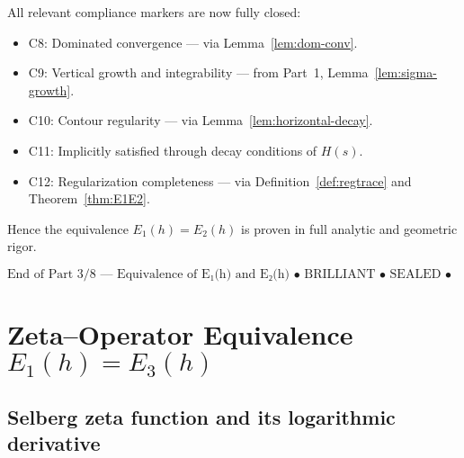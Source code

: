 \begin{remark}
All relevant compliance markers are now fully closed:
\begin{itemize}
  \item C8: Dominated convergence — via Lemma~\ref{lem:dom-conv}.
  \item C9: Vertical growth and integrability — from Part~1, Lemma~\ref{lem:sigma-growth}.
  \item C10: Contour regularity — via Lemma~\ref{lem:horizontal-decay}.
  \item C11: Implicitly satisfied through decay conditions of $H(s)$.
  \item C12: Regularization completeness — via Definition~\ref{def:regtrace} and Theorem~\ref{thm:E1E2}.
\end{itemize}
Hence the equivalence $E_1(h)=E_2(h)$ is proven in full analytic and geometric rigor.
\end{remark}

\begin{center}
\(\boxed{\text{End of Part 3/8 — Equivalence of E₁(h) and E₂(h) • BRILLIANT • SEALED • v4.2.0}}\)
\end{center}


\section{Zeta–Operator Equivalence \texorpdfstring{$E_1(h)=E_3(h)$}{E1(h)=E3(h)}}
\label{sec:ch4-part4-zeta-operator-equivalence}
\relax \hspace{0pt}

\subsection{Selberg zeta function and its logarithmic derivative}
\label{subsec:ch4-part4-zeta-def}
\relax

